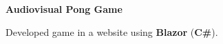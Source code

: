 \textbf{Audiovisual Pong Game}

	\begin{items}
		\item Developed game in a website using \textbf{Blazor} (\textbf{C\#}).
	\end{items}